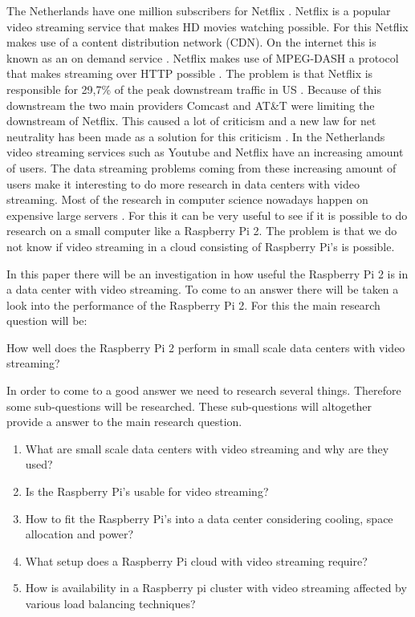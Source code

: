 \documentclass{sig-alternate-br}
\begin{document}
The Netherlands have one million subscribers for Netflix \cite{volkskrant}. Netflix is a popular video streaming service that makes HD movies watching possible. For this Netflix makes use of a content distribution network (CDN). On the internet this is known as an on demand service \cite{Adhikari:2012}. Netflix makes use of MPEG-DASH a protocol that makes streaming over HTTP possible \cite{martin:2013}. The problem is that Netflix is responsible for  29,7\% of the peak downstream traffic in US \cite{Adhikari:2012}. Because of this downstream the two main providers Comcast and  AT\&T were limiting the downstream of Netflix. This caused a lot of criticism and a new law for net neutrality has been made as a solution for this criticism \cite{net-neutrality}. \newline
In the Netherlands video streaming services such as Youtube and Netflix have an increasing amount of users. The data streaming problems coming from these increasing amount of users make it interesting to do more research in data centers with video streaming. Most of the research in computer science nowadays happen on expensive large servers \cite{tso:2013}. For this it can be very useful to see if it is possible to do research on a small computer like a Raspberry Pi 2. The problem is that we do not know if video streaming in a cloud consisting of Raspberry Pi's is possible. 

In this paper there will be an investigation in how useful the Raspberry Pi 2 is in a data center with video streaming. To come to an answer there will be taken a look into the performance of the Raspberry Pi 2. For this the main research question will be: 
\begin{center}
How well does the Raspberry Pi 2 perform in small scale data centers with video streaming? 
\end{center}

In order to come to a good answer we need to  research several things. Therefore some sub-questions will be researched. These sub-questions will altogether provide a answer to the main research question. 

\begin{enumerate}
	\item What are small scale data centers with video streaming and why are they used?
	\item Is the Raspberry Pi's usable for video streaming?
	\item How to fit the Raspberry Pi's into a data center considering cooling, space allocation and power?
	\item What setup does a Raspberry Pi cloud with video streaming require?
	\item How is availability in a Raspberry pi cluster with video streaming affected by various load balancing techniques? 
\end{enumerate}
\end{document}

